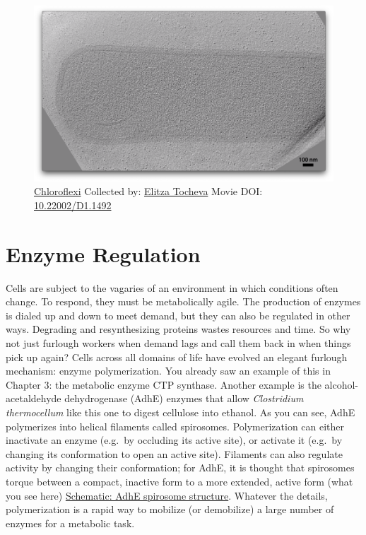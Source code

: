 \documentclass[]{tufte-book}
\begin{document}
\begin{figure}
\includegraphics{movie_stills/4_4} \caption[\protect\hyperlink{tree}{Chloroflexi} Collected by:
\protect\hyperlink{elitza_tocheva}{Elitza Tocheva} Movie DOI:
\href{https://doi.org/10.22002/D1.1492}{10.22002/D1.1492}]{\protect\hyperlink{tree}{Chloroflexi} Collected by:
\protect\hyperlink{elitza_tocheva}{Elitza Tocheva} Movie DOI:
\href{https://doi.org/10.22002/D1.1492}{10.22002/D1.1492}}\label{fig:4-4}
\end{figure}

\section{Enzyme Regulation}\label{enzyme-regulation}

Cells are subject to the vagaries of an environment in which conditions
often change. To respond, they must be metabolically agile. The
production of enzymes is dialed up and down to meet demand, but they can
also be regulated in other ways. Degrading and resynthesizing proteins
wastes resources and time. So why not just furlough workers when demand
lags and call them back in when things pick up again? Cells across all
domains of life have evolved an elegant furlough mechanism: enzyme
polymerization. You already saw an example of this in Chapter 3: the
metabolic enzyme CTP synthase. Another example is the
alcohol-acetaldehyde dehydrogenase (AdhE) enzymes that allow
\emph{Clostridium thermocellum} like this one to digest cellulose into
ethanol. As you can see, AdhE polymerizes into helical filaments called
spirosomes. Polymerization can either inactivate an enzyme (e.g.~by
occluding its active site), or activate it (e.g.~by changing its
conformation to open an active site). Filaments can also regulate
activity by changing their conformation; for AdhE, it is thought that
spirosomes torque between a compact, inactive form to a more extended,
active form (what you see here)
\protect\hyperlink{AdhE_spirosome_structure}{Schematic: AdhE spirosome
structure}. Whatever the details, polymerization is a rapid way to
mobilize (or demobilize) a large number of enzymes for a metabolic task.
\end{document}
